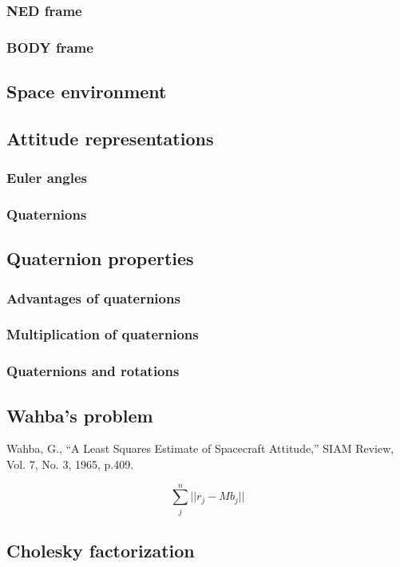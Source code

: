 \documentclass[12pt,a4paper,oneside]{article}
\begin{document}
\subsubsection{NED frame}
\subsubsection{BODY frame}
\subsection{Space environment}
\subsection{Attitude representations}
\subsubsection{Euler angles}
\subsubsection{Quaternions}
\subsection{Quaternion properties}
\subsubsection{Advantages of quaternions}
\subsubsection{Multiplication of quaternions}
\subsubsection{Quaternions and rotations}
\subsection{Wahba's problem}
Wahba, G., “A Least Squares Estimate of Spacecraft Attitude,” SIAM Review, Vol. 7, No.
3, 1965, p.409.

\begin{equation}
\sum_j^n ||r_j - Mb_j||
\end{equation}
\subsection{Cholesky factorization}
\end{document}

